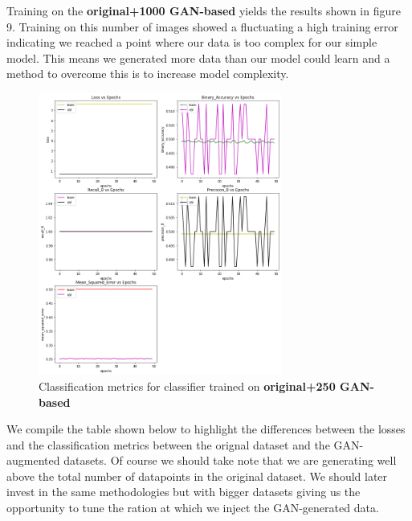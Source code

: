 \documentclass[conference]{IEEEtran}
\begin{document}
Training on the \textbf{original+1000 GAN-based} yields the results shown in figure 9. Training on this number of images showed a fluctuating a high training error indicating we reached a point where our data is too complex for our simple model. This means we generated more data than our model could learn and a method to overcome this is to increase model complexity.

\begin{figure}[htbp]
\centerline{\includegraphics[width=80mm]{plot_1000.png}}
\caption{Classification metrics for classifier trained on \textbf{original+250 GAN-based}}
\label{fig}
\end{figure}

We compile the table shown below to highlight the differences between the losses and the classification metrics between the orignal dataset and the GAN-augmented datasets. 
Of course we should take note that we are generating well above the total number of datapoints in the original dataset. We should later invest in the same methodologies but with bigger datasets giving us the opportunity to tune the ration at which we inject the GAN-generated data.
\end{document}
